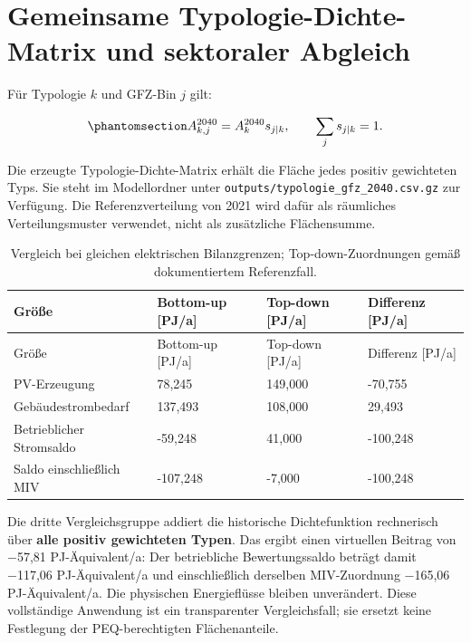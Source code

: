\documentclass[
  ngerman,
  a4paper,
  DIV=11]{scrreprt}
\begin{document}
\section{Gemeinsame Typologie-Dichte-Matrix und sektoraler
Abgleich}\label{gemeinsame-typologie-dichte-matrix-und-sektoraler-abgleich}

Für Typologie \(k\) und GFZ-Bin \(j\) gilt:

\begin{equation}\protect\phantomsection\label{eq-typologie-gfz-flaeche}{
A_{k,j}^{2040}=A_k^{2040}s_{j|k},\qquad\sum_j s_{j|k}=1.
}\end{equation}

Die erzeugte Typologie-Dichte-Matrix erhält die Fläche jedes positiv
gewichteten Typs. Sie steht im Modellordner unter
\texttt{outputs/typologie\_gfz\_2040.csv.gz} zur Verfügung. Die
Referenzverteilung von 2021 wird dafür als räumliches Verteilungsmuster
verwendet, nicht als zusätzliche Flächensumme.

\begin{longtable}[]{@{}llll@{}}
\caption{Vergleich bei gleichen elektrischen Bilanzgrenzen;
Top-down-Zuordnungen gemäß dokumentiertem
Referenzfall.}\label{tbl-gebaeude-abgleich}\tabularnewline
\toprule\noalign{}
Größe & Bottom-up {[}PJ/a{]} & Top-down {[}PJ/a{]} & Differenz
{[}PJ/a{]} \\
\midrule\noalign{}
\endfirsthead
\toprule\noalign{}
Größe & Bottom-up {[}PJ/a{]} & Top-down {[}PJ/a{]} & Differenz
{[}PJ/a{]} \\
\midrule\noalign{}
\endhead
\bottomrule\noalign{}
\endlastfoot
PV-Erzeugung & 78,245 & 149,000 & -70,755 \\
Gebäudestrombedarf & 137,493 & 108,000 & 29,493 \\
Betrieblicher Stromsaldo & -59,248 & 41,000 & -100,248 \\
Saldo einschließlich MIV & -107,248 & -7,000 & -100,248 \\
\end{longtable}

Die dritte Vergleichsgruppe addiert die historische Dichtefunktion
rechnerisch über \textbf{alle positiv gewichteten Typen}. Das ergibt
einen virtuellen Beitrag von −57,81 PJ-Äquivalent/a: Der betriebliche
Bewertungssaldo beträgt damit −117,06 PJ-Äquivalent/a und einschließlich
derselben MIV-Zuordnung −165,06 PJ-Äquivalent/a. Die physischen
Energieflüsse bleiben unverändert. Diese vollständige Anwendung ist ein
transparenter Vergleichsfall; sie ersetzt keine Festlegung der
PEQ-berechtigten Flächenanteile.
\end{document}
